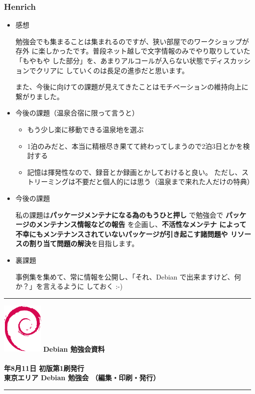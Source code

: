 \documentclass[mingoth,a4paper]{jsarticle}
\newcommand{\debmtgyear}{2008}
\newcommand{\debmtgmonth}{8}
\newcommand{\debmtgdate}{11}
\begin{document}
\subsubsection{Henrich}
\begin{itemize}
\item 感想

勉強会でも集まることは集まれるのですが、狭い部屋でのワークショップが存外
に楽しかったです。普段ネット越しで文字情報のみでやり取りしていた「もやもや
した部分」を、あまりアルコールが入らない状態でディスカッションでクリアに
していくのは長足の進歩だと思います。

また、今後に向けての課題が見えてきたことはモチベーションの維持向上に繋がりました。


\item 今後の課題（温泉合宿に限って言うと）

\begin{itemize}
\item もう少し楽に移動できる温泉地を選ぶ
\item 1泊のみだと、本当に精根尽き果てて終わってしまうので2泊3日とかを検討する
\item 記憶は揮発性なので、録音とか録画とかしておけると良い。
ただし、ストリーミングは不要だと個人的には思う（温泉まで来れた人だけの特典）
\end{itemize}

\item 今後の課題

私の課題は{\bf パッケージメンテナになる為のもうひと押し} で勉強会で
{\bf パッケージのメンテナンス情報などの報告} を企画し、{\bf 不活性なメンテナ
によって不幸にもメンテナンスされていないパッケージが引き起こす諸問題や
リソースの割り当て問題の解決}を目指します。

\item 裏課題

事例集を集めて、常に情報を公開し、「それ、Debian で出来ますけど、何か？」を言えるように
しておく :-)
\end{itemize}

\newpage


\cleartooddpage

\vspace*{15cm}
\hrule
\vspace{2mm}
\includegraphics[width=2cm]{image200502/openlogo-nd.eps}
\noindent \Large \bf Debian 勉強会資料\\ \\
\noindent \normalfont \debmtgyear{}年\debmtgmonth{}月\debmtgdate{}日 \hspace{5mm}  初版第1刷発行\\
\noindent \normalfont 東京エリア Debian 勉強会 （編集・印刷・発行）\\
\hrule
\end{document}
